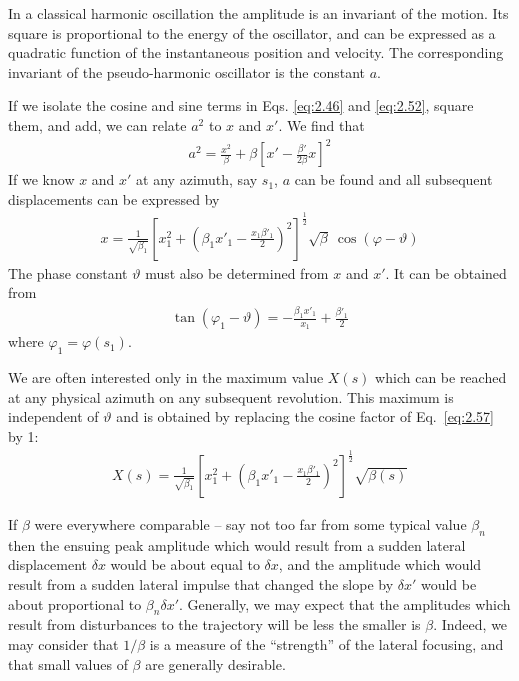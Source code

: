 In a classical harmonic oscillation the amplitude is an invariant of the motion. Its square is proportional to the energy of the oscillator, and can be expressed as a quadratic function of the instantaneous position and velocity. The corresponding invariant of the pseudo-harmonic oscillator is the constant $a$.

If we isolate the cosine and sine terms in Eqs. \eqref{eq:2.46} and \eqref{eq:2.52}, square them, and add, we can relate $a^2$ to $x$ and $x'$. We find that
\begin{align}
	a^2 = \frac{x^2}{\beta} + \beta\left[x'-\frac{\beta'}{2\beta}x\right]^2\label{eq:2.56}
\end{align}
If we know $x$ and $x'$ at any azimuth, say $s_1$, $a$ can be found and all subsequent displacements can be expressed by
\begin{align}
	x = \frac{1}{\sqrt{\beta_1}}\left[x_1^2+\left(\beta_1x'_1-\frac{x_1\beta'_1}{2}\right)^2\right]^\frac{1}{2}\sqrt{\beta}\ \cos(\varphi-\vartheta)\label{eq:2.57}
\end{align}
The phase constant $\vartheta$ must also be determined from $x$ and $x'$. It can be obtained from
\begin{align}
	\tan(\varphi_1 - \vartheta) = -\frac{\beta_1 x'_1}{x_1}+\frac{\beta'_1}{2}
\end{align}
where $\varphi_1 = \varphi(s_1)$.

We are often interested only in the maximum value $X(s)$ which can be reached at any physical azimuth on any subsequent revolution. This maximum is independent of $\vartheta$ and is obtained by replacing the cosine factor of Eq.~\eqref{eq:2.57} by 1:
\begin{align}
	X(s) = \frac{1}{\sqrt{\beta_1}}\left[x_1^2+\left(\beta_1x'_1-\frac{x_1\beta'_1}{2}\right)^2\right]^\frac{1}{2}\sqrt{\beta(s)}
\end{align}

If $\beta$ were everywhere comparable -- say not too far from some typical value $\beta_n$ then the ensuing peak amplitude which would result from a sudden lateral displacement $\delta x$ would be about equal to $\delta x$, and the amplitude which would result from a sudden lateral impulse that changed the slope by $\delta x'$ would be about proportional to $\beta_n \delta x'$. Generally, we may expect that the amplitudes which result from disturbances to the trajectory will be less the smaller is $\beta$. Indeed, we may consider that $1/\beta$ is a measure of the “strength” of the lateral focusing, and that small values of $\beta$ are generally desirable.
